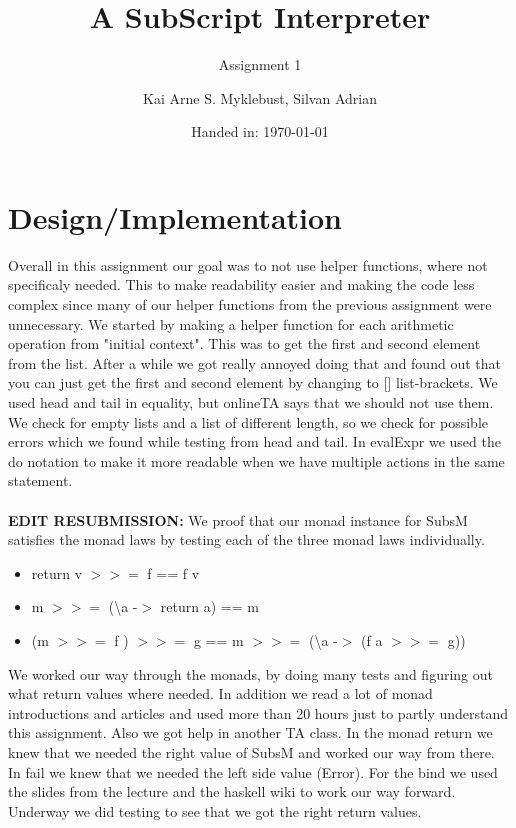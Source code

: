 \documentclass[12pt,a4paper]{article}
\begin{document}
\title{A SubScript Interpreter}
\subtitle{Assignment 1}

\author{Kai Arne S. Myklebust, Silvan Adrian}
\date{Handed in: \today}
	
\maketitle
\tableofcontents

\section{Design/Implementation}

Overall in this assignment our goal was to not use helper functions, where not specificaly needed. This to make readability easier and making the code less complex since many of our helper functions from the previous assignment were unnecessary.
We started by making a helper function for each arithmetic operation from "initial context". This was to get the first and second element from the list. After a while we got really annoyed doing that and found out that you can just get the first and second element by changing to [] list-brackets.
We used head and tail in equality, but onlineTA says that we should not use them. We check for empty lists and a list of different length, so we check for possible errors which we found while testing from head and tail.
In evalExpr we used the do notation to make it more readable when we have multiple actions in the same statement.\\\\
\textbf{EDIT RESUBMISSION:}
We proof that our monad instance for SubsM satisfies the monad laws by testing each of the three monad laws individually.
\begin{itemize}
	\item return v $>>=$ f == f v
	\item m $>>=$ (\textbackslash a -$>$ return a) == m
	\item (m $>>=$ f ) $>>=$ g == m $>>=$ (\textbackslash a -$>$ (f a $>>=$ g))
\end{itemize}

We worked our way through the monads, by doing many tests and figuring out what return values where needed. In addition we read a lot of monad introductions and articles and used more than 20 hours just to partly understand this assignment. Also we got help in another TA class.
In the monad return we knew that we needed the right value of SubsM and worked our way from there. In fail we knew that we needed the left side value (Error).
For the bind we used the slides from the lecture and the haskell wiki to work our way forward. Underway we did testing to see that we got the right return values.
\end{document}
